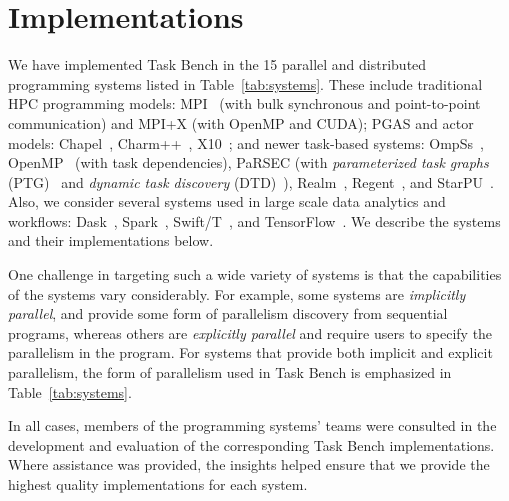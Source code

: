 \section{Implementations}
\label{sec:implementation}



We have implemented Task Bench in the 15 parallel and distributed
programming systems listed in Table~\ref{tab:systems}. These include
traditional HPC programming models: MPI~\cite{MPI} (with bulk
synchronous and point-to-point communication) and MPI+X (with OpenMP
and CUDA); PGAS and actor models: Chapel~\cite{Chapel15},
Charm++~\cite{Charmpp93}, X10~\cite{X1005}; and newer task-based
systems: OmpSs~\cite{OmpSs11}, OpenMP~\cite{OpenMPSpec40} (with task
dependencies), PaRSEC (with \emph{parameterized task graphs}
(PTG)~\cite{PARSEC13} and \emph{dynamic task discovery}
(DTD)~\cite{PARSEC_DTD}), Realm~\cite{Realm14},
Regent~\cite{Regent15}, and StarPU~\cite{StarPU11}. Also, we consider
several systems used in large scale data analytics and workflows:
Dask~\cite{Dask15}, Spark~\cite{Spark10}, Swift/T~\cite{Wozniak13},
and TensorFlow~\cite{TensorFlow15}. We describe the systems and their implementations below.

One challenge in targeting such a wide variety of
systems is that the capabilities of the systems vary considerably. For
example, some systems are \emph{implicitly parallel}, and provide some
form of parallelism discovery from sequential programs, whereas others
are \emph{explicitly parallel} and require users to specify the
parallelism in the program. For systems that provide both implicit and explicit parallelism, the form of parallelism used in Task Bench is emphasized in Table~\ref{tab:systems}.



In all cases, members of the programming systems' teams
were consulted in the development and evaluation of the
corresponding Task Bench implementations. Where assistance was provided, the insights helped ensure that we provide the highest quality implementations for each system.

